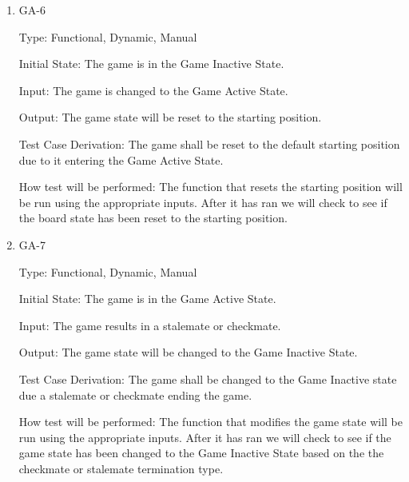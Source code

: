 \documentclass[12pt, titlepage]{article}
\begin{document}
\begin{enumerate}

\item{GA-6\\}

Type: Functional, Dynamic, Manual
                    
Initial State: The game is in the Game Inactive State.
                    
Input: The game is changed to the Game Active State.

Output: The game state will be reset to the starting position.
                    
Test Case Derivation: The game shall be reset to the default starting position due to it entering the Game Active State.

How test will be performed: The function that resets the starting position will be run using the appropriate inputs.
After it has ran we will check to see if the board state has been reset to the starting position.

\item{GA-7\\}

Type: Functional, Dynamic, Manual
                    
Initial State: The game is in the Game Active State.
                    
Input: The game results in a stalemate or checkmate.

Output: The game state will be changed to the Game Inactive State.
                    
Test Case Derivation: The game shall be changed to the Game Inactive state due a stalemate or checkmate ending the game.

How test will be performed: The function that modifies the game state will be run using the appropriate inputs.
After it has ran we will check to see if the game state has been changed to the Game Inactive State based on the
the checkmate or stalemate termination type.


                    
                    

                    


\end{enumerate}
\end{document}
